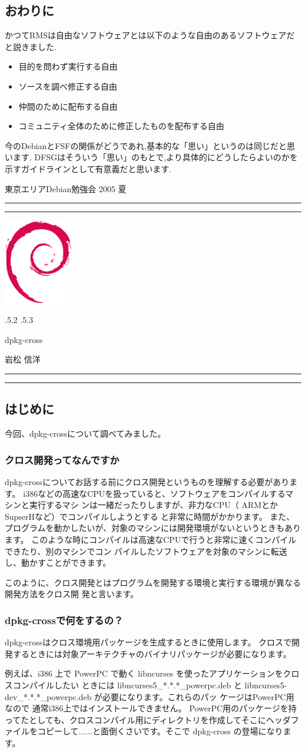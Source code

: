 \documentclass[mingoth,a4paper]{jsarticle}
\makeatletter
\renewcommand{\section}{\@startsection{section}{1}{\z@}%
    {\Cvs \@plus.5\Cdp \@minus.2\Cdp}%
    {.5\Cvs \@plus.3\Cdp}%
    {\normalfont\Large\headfont\raggedright\centering}} %
\newcommand{\dancersection}[2]{%
\newpage
東京エリアDebian勉強会 2005 夏
\hrule
\vspace{0.5mm}
\hrule
\hfill{}\includegraphics[width=3cm]{image200502/openlogo-nd.eps}\\
\vspace{-4cm}
\begin{center}
  \section{#1}
\end{center}
\hfill{}#2\hspace{3cm}\space\\
\hrule
\hrule
\vspace{1cm}
}
\makeatother
\begin{document}
\subsection{おわりに}
かつてRMSは自由なソフトウェアとは以下のような自由のあるソフトウェアだと説きました.
\begin{itemize}
\item 目的を問わず実行する自由
\item ソースを調べ修正する自由
\item 仲間のために配布する自由
\item コミュニティ全体のために修正したものを配布する自由
\end{itemize}
今のDebianとFSFの関係がどうであれ,基本的な「思い」というのは同じだと思います.
DFSGはそういう「思い」のもとで,より具体的にどうしたらよいのかを示すガイドラインとして有意義だと思います.

\dancersection{dpkg-cross}{岩松 信洋}

\subsection{はじめに}
今回、dpkg-crossについて調べてみました。
\subsubsection{クロス開発ってなんですか}
dpkg-crossについてお話する前にクロス開発というものを理解する必要があります。
i386などの高速なCPUを扱っていると、ソフトウェアをコンパイルするマシンと実行するマシ
ンは一緒だったりしますが、非力なCPU（ ARMとかSupserHなど）でコンパイルしようとする
と非常に時間がかかります。
また、プログラムを動かしたいが、対象のマシンには開発環境がないというときもあります。
このような時にコンパイルは高速なCPUで行うと非常に速くコンパイルできたり、別のマシンでコン
パイルしたソフトウェアを対象のマシンに転送し、動かすことができます。

このように、クロス開発とはプログラムを開発する環境と実行する環境が異なる開発方法をクロス開
発と言います。

\subsubsection{dpkg-crossで何をするの？}
dpkg-crossはクロス環境用パッケージを生成するときに使用します。
クロスで開発するときには対象アーキテクチャのバイナリパッケージが必要になります。

例えば、i386 上で PowerPC で動く libncurses を使ったアプリケーションをクロスコンパイルしたい
ときには libncurses5\_*.*.*\_powerpc.deb  と libncurses5-dev\_*.*.*\_powerpc.deb が必要になります。これらのパッ
ケージはPowerPC用なので 通常i386上ではインストールできません。 PowerPC用のパッケージを持ってたとしても、クロスコンパイル用にディレクトリを作成してそこにヘッダファイルをコピーして......と面倒くさいです。そこで dpkg-cross の登場になります。
\end{document}
